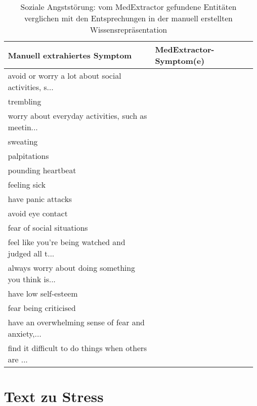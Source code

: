 \begin{table}[H]
\begin{center}
\begin{tabular}{ll}
\toprule
                      Manuell extrahiertes Symptom &       MedExtractor-Symptom(e) \\
\midrule
avoid or worry a lot about social activities, s... &               \\
                                         trembling &               \\
worry about everyday activities, such as meetin... &               \\
                                          sweating &               \\
                                      palpitations &               \\
                                pounding heartbeat &               \\
                                      feeling sick &               \\
                                have panic attacks &               \\
                                 avoid eye contact &               \\
                         fear of social situations &               \\
feel like you're being watched and judged all t... &               \\
always worry about doing something you think is... &               \\
                              have low self-esteem &               \\
                             fear being criticised &               \\
have an overwhelming sense of fear and anxiety,... &               \\
find it difficult to do things when others are ... &               \\
\bottomrule
\end{tabular}
\caption{Soziale Angststörung: vom MedExtractor gefundene Entitäten verglichen mit den Entsprechungen in der manuell erstellten Wissensrepräsentation}
\label{tab:socialanxiety_medextractor_manuell}
\end{center}
\end{table}

\section{Text zu Stress}
\label{sec:stress} 

